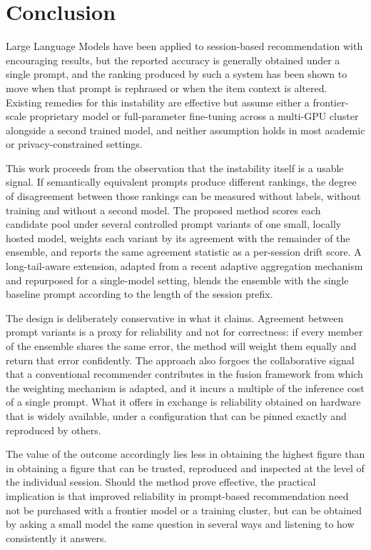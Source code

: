 \documentclass[12pt,a4paper,oneside]{report}
\begin{document}
\chapter{Conclusion}

Large Language Models have been applied to session-based recommendation with
encouraging results, but the reported accuracy is generally obtained under a
single prompt, and the ranking produced by such a system has been shown to move
when that prompt is rephrased or when the item context is altered. Existing
remedies for this instability are effective but assume either a frontier-scale
proprietary model or full-parameter fine-tuning across a multi-GPU cluster
alongside a second trained model, and neither assumption holds in most academic
or privacy-constrained settings.

This work proceeds from the observation that the instability itself is a usable
signal. If semantically equivalent prompts produce different rankings, the
degree of disagreement between those rankings can be measured without labels,
without training and without a second model. The proposed method scores each
candidate pool under several controlled prompt variants of one small, locally
hosted model, weights each variant by its agreement with the remainder of the
ensemble, and reports the same agreement statistic as a per-session drift score.
A long-tail-aware extension, adapted from a recent adaptive aggregation
mechanism and repurposed for a single-model setting, blends the ensemble with the
single baseline prompt according to the length of the session prefix.

The design is deliberately conservative in what it claims. Agreement between
prompt variants is a proxy for reliability and not for correctness: if every
member of the ensemble shares the same error, the method will weight them
equally and return that error confidently. The approach also forgoes the
collaborative signal that a conventional recommender contributes in the fusion
framework from which the weighting mechanism is adapted, and it incurs a
multiple of the inference cost of a single prompt. What it offers in exchange is
reliability obtained on hardware that is widely available, under a configuration
that can be pinned exactly and reproduced by others.

The value of the outcome accordingly lies less in obtaining the highest figure
than in obtaining a figure that can be trusted, reproduced and inspected at the
level of the individual session. Should the method prove effective, the practical
implication is that improved reliability in prompt-based recommendation need not
be purchased with a frontier model or a training cluster, but can be obtained by
asking a small model the same question in several ways and listening to how
consistently it answers.
\end{document}
